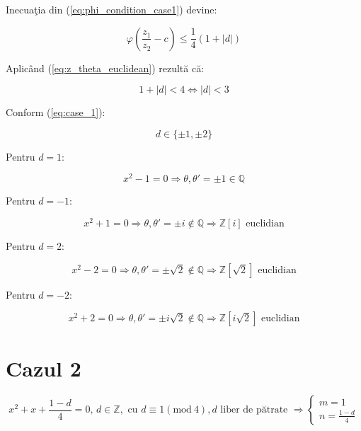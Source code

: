 \documentclass[12t]{article}
\begin{document}
Inecuaţia din (\ref{eq:phi_condition_case1}) devine:

\begin{equation}
    \varphi \left(\frac{z_1}{z_2} - c\right) \leq \frac{1}{4}(1 + |d|)
\end{equation}

Aplicând (\ref{eq:z_theta_euclidean}) rezultă că:

\begin{equation}
    1 + |d| < 4 \Leftrightarrow |d| < 3
\end{equation}

Conform (\ref{eq:case_1}):

\begin{equation*}
    d \in \{\pm 1, \pm 2\}
\end{equation*}

Pentru $d = 1$:

\begin{equation*}
    x^2 - 1 = 0 \Rightarrow \theta, \theta' = \pm 1 \in \mathbb{Q}
\end{equation*}

Pentru $d = -1$:

\begin{equation}
    x^2 + 1 = 0 \Rightarrow \theta, \theta' = \pm i \notin \mathbb{Q} \Rightarrow \boxed{\mathbb{Z}[i] \text{ euclidian}}
\end{equation}

Pentru $d = 2$:

\begin{equation}
    x^2 - 2 = 0 \Rightarrow \theta, \theta' = \pm \sqrt{2} \notin \mathbb{Q} \Rightarrow \boxed{\mathbb{Z}[\sqrt{2}] \text{ euclidian}}
\end{equation}

Pentru $d = -2$:

\begin{equation}
    x^2 + 2 = 0 \Rightarrow \theta, \theta' = \pm i\sqrt{2} \notin \mathbb{Q} \Rightarrow \boxed{\mathbb{Z}[i\sqrt{2}] \text{ euclidian}}
\end{equation}

\section*{Cazul 2} 
\begin{equation} \label{eq:case_2}
x^2 + x + \frac{1 - d}{4} = 0, \, d \in \mathbb{Z},
\text{ cu } d \equiv 1 (\text{mod}\ 4), d \text{ liber de pătrate }
\Rightarrow \begin{cases} m = 1 \\ n = \frac{1-d}{4} \end{cases}
\end{equation}
\end{document}
